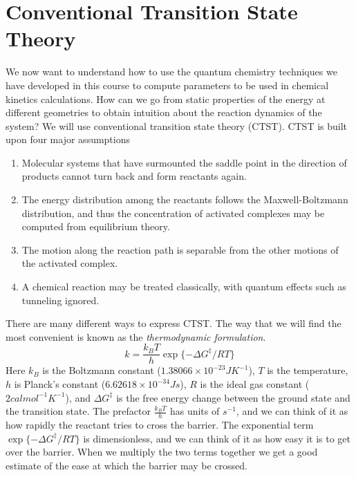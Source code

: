 \section{Conventional Transition State Theory}
We now want to understand how to use the quantum chemistry techniques
we have developed in this course to compute parameters to be used in
chemical kinetics calculations.
How can we go from static
properties of the energy at different geometries to obtain intuition
about the reaction dynamics of the system? We will use conventional
transition state theory (CTST). CTST is built upon four major
assumptions
\begin{enumerate}
\item Molecular systems that have surmounted the saddle point in the
direction of products cannot turn back and form reactants again.
\item The energy distribution among the reactants follows the
Maxwell-Boltzmann distribution, and thus the concentration of
activated complexes may be computed from equilibrium theory.
\item The motion along the reaction path is separable from the other
motions of the activated complex.
\item A chemical reaction may be treated classically, with quantum
effects such as tunneling ignored.
\end{enumerate}
There are many different ways to express CTST. The way that we will
find the most convenient is known as the \emph{thermodynamic
formulation}. 
\begin{equation}
 k = \frac{k_BT}{h}\exp\{-\Delta G^\ddag/RT\}
\label{tst}
\end{equation}
Here $k_B$ is the Boltzmann constant ($1.38066\times 10^{-23}
JK^{-1}$), $T$ is the temperature, $h$ is Planck's constant
($6.62618\times 10^{-34} Js$), $R$ is the ideal gas constant ($2 cal
mol^{-1}K^{-1}$), and $\Delta G^\ddag$ is the free energy change
between the ground state and the transition state. The prefactor
$\frac{k_BT}{h}$ has units of $s^{-1}$, and we can think of it as how
rapidly the reactant tries to cross the barrier. The exponential term
$\exp\{-\Delta G^\ddag/RT\}$ is dimensionless, and we can think of it
as how easy it is to get over the barrier. When we multiply the two
terms together we get a good estimate of the ease at which the barrier
may be crossed.


